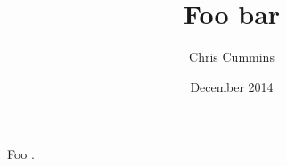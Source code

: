 
\author{Chris Cummins}

\date{December 2014}

\title{Foo bar}
\newcommand{\multilinetitle}{Foo\\bar}

\newcommand{\subtitle}{Baz}

\newcommand{\degreeTitle}{MSc by Research\\ Pervasive Parallelism}

\newcommand{\institution}{School of Informatics,\\
  The University of Edinburgh}













\tableofcontents
\listoffigures
\newpage


Foo \cite{ibm2003uml}.


\newpage
\begin{appendices}
\end{appendices}

\label{bibliography}
{}



